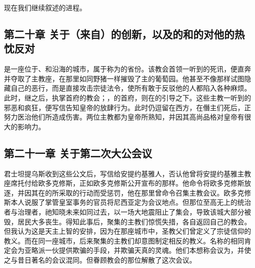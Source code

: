 现在我们继续叙述的进程。\par


\subsection{第二十章 关于（来自）的创新，以及的和的对他的热忱反对}

是一座位于、和沿海的城市，属于称为的省份。该教会首领一听到的死讯，便直奔并夺取了主教座，在那里如同野猪一样摧毁了主的葡萄园。他甚至不像那样试图隐藏自己的恶行，而是直接攻击宗徒法令，使所有敢于反驳他的人都陷入各种麻烦。此时，继之后，执掌首府的教会；，的首府，则在的引导之下。这些主教一听到的邪恶和疯狂，便写信告知皇帝的放肆行为。此时仍逗留在西方，在僭主们死后，正努力医治他们所造成伤害。两位主教都为皇帝所熟知，并因其高尚品格对皇帝有很大的影响力。\par


\subsection{第二十一章 关于第二次大公会议}

君士坦提乌斯收到这些公文后，写信给安提约基雅人，否认他曾将安提约基雅主教座席托付给欧多克修斯，正如欧多克修斯公开宣布的那样。他命令将欧多克修斯放逐，并因其在的所采取的行动而受惩罚，他在那里曾命令召集主教会议。欧多克修斯本人说服了掌管皇室事务的官员将尼西亚定为会议地点。但那位至高无上的统治者与治理者，祂知晓未来如同过去，以一场大地震阻止了集会，导致该城大部分被毁，居民大多丧生。得知此事后，聚集的主教们惊慌失措，各自返回自己的教会。但我认为这是天主上智的安排，因为在那座城市中，圣教父们曾定义了宗徒信仰的教义。而在同一座城市，后来聚集的主教们却意图制定相反的教义。名称的相同肯定会为亚略派一伙提供欺骗的手段，并欺骗天真的灵魂。他们本想称会议为，并使之与昔日著名的会议混同。但眷顾教会的那位解散了这次会议。\par

